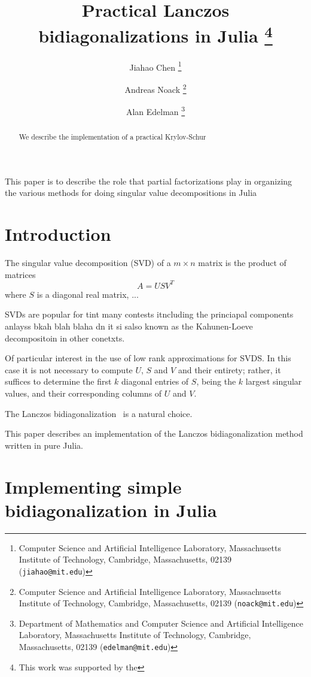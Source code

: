 \documentclass[final,leqno]{siamltex1213}
\title{Practical Lanczos bidiagonalizations in Julia
    \thanks{This
        work was supported by the
	}}
\author{%
    Jiahao Chen
    \thanks{Computer Science and Artificial Intelligence Laboratory,
           Massachusetts Institute of Technology,
           Cambridge, Massachusetts, 02139 ({\tt jiahao@mit.edu})}
    \and
    Andreas Noack
    \thanks{Computer Science and Artificial Intelligence Laboratory,
            Massachusetts Institute of Technology,
            Cambridge, Massachusetts, 02139 ({\tt noack@mit.edu})}
    \and
    Alan Edelman
    \thanks{Department of Mathematics and Computer Science and Artificial Intelligence Laboratory,
            Massachusetts Institute of Technology,
            Cambridge, Massachusetts, 02139 ({\tt edelman@mit.edu})}
}
\begin{document}
\maketitle

\begin{abstract}
We describe the implementation of a practical Krylov-Schur
\end{abstract}

\begin{keywords}
\end{keywords}

\begin{AMS}
\end{AMS}

\pagestyle{myheadings}
\thispagestyle{plain}

\listoftodos

This paper is to describe the role that partial factorizations play in
organizing the various methods for doing singular value decompositions in
Julia


\section{Introduction}

The singular value decomposition (SVD) of a $m\times n$ matrix is
the product of matrices
\[
A=USV^{T}
\]
where $S$ is a diagonal real matrix, ...

SVDs are popular for tint many contests itncluding the princiapal
components anlayss bkah blah blaha dn it si salso known as the Kahunen-Loeve
decompositoin in other conetxts.

Of particular interest in the use of low rank approximations for SVDS.
In this case it is not necessary to compute $U$, $S$ and $V$ and
their entirety; rather, it suffices to determine the first $k$ diagonal
entries of $S$, being the $k$ largest singular values, and their
corresponding columns of $U$ and $V$.

The Lanczos bidiagonalization~\cite{Golub1965} is a natural choice.

This paper describes an implementation of the Lanczos bidiagonalization
method written in pure Julia.


\section{Implementing simple bidiagonalization in Julia}
\end{document}
